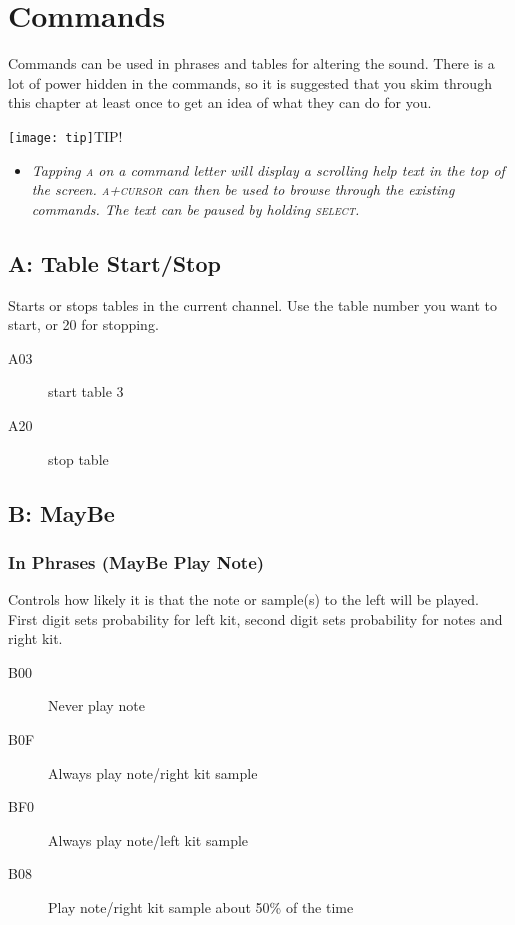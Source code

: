 \chapter{Commands}

Commands can be used in phrases and tables for altering the sound. There is a lot of power hidden in the commands, so it is suggested that you skim through this chapter at least once to get an idea of what they can do for you.

\texttt{[image: tip]}TIP!
\begin{itemize}
        \item \textit{Tapping \textsc{a} on a command letter will display a scrolling help text in the top of the screen. \textsc{a+cursor} can then be used to browse through the existing commands. The text can be paused by holding \textsc{select}.}
	\end{itemize}

\section{A: Table Start/Stop}

Starts or stops tables in the current channel. Use the table number you want to start, or 20 for stopping.

\begin{description}
\item[A03] start table 3
\item[A20] stop table
\end{description}

\section{B: MayBe}

\subsection{In Phrases (MayBe Play Note)}

Controls how likely it is that the note
or sample(s) to the left will be played.
First digit sets probability for left kit,
second digit sets probability for notes
and right kit.

\begin{description}
    \item[B00] Never play note
    \item[B0F] Always play note/right kit sample
    \item[BF0] Always play note/left kit sample
    \item[B08] Play note/right kit sample about 50\% of the time
\end{description}


